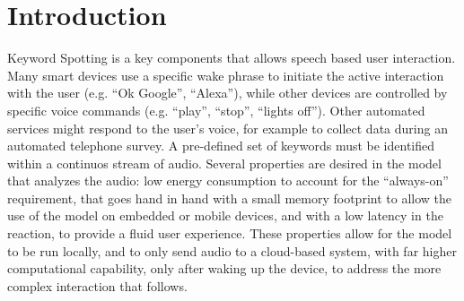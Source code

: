 
\section{Introduction}
\label{sec:introduction}


Keyword Spotting is a key components that allows speech based user interaction.
%
Many smart devices use a specific wake phrase to initiate the active
interaction with the user (e.g. ``Ok Google'', ``Alexa''), while other devices
are controlled by specific voice commands (e.g. ``play'', ``stop'', ``lights
off'').
%
Other automated services might respond to the user's voice, for example to
collect data during an automated telephone survey.
%
A pre-defined set of keywords must be identified within a continuos stream of
audio. Several properties are desired in the model that analyzes the audio: low
energy consumption to account for the ``always-on'' requirement, that goes hand
in hand with a small memory footprint to allow the use of the model on embedded
or mobile devices, and with a low latency in the reaction, to provide a fluid
user experience.
%
These properties allow for the model to be run locally, and to only send audio
to a cloud-based system, with far higher computational capability, only after
waking up the device, to address the more complex interaction that follows.



